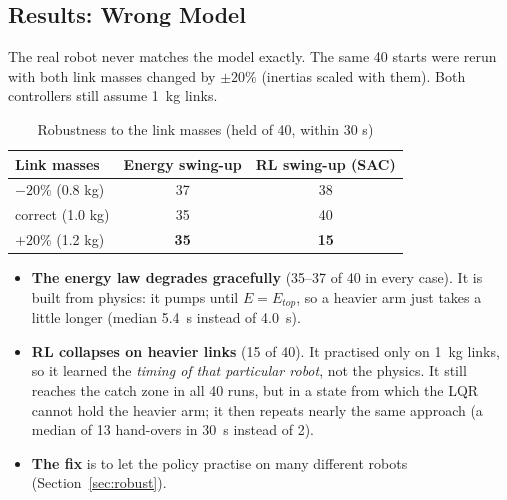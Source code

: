 \documentclass[12pt,a4paper]{article}
\begin{document}
\subsection{Results: Wrong Model}
The real robot never matches the model exactly. The same 40 starts were rerun with both link masses changed by $\pm20\%$ (inertias scaled with them). Both controllers still assume 1~kg links.
\begin{table}[H]
\centering
\caption{Robustness to the link masses (held of 40, within 30 s)}
\label{tab:rlrob}
\begin{tabular}{|l|c|c|}
\hline
Link masses & Energy swing-up & RL swing-up (SAC)\\ \hline
$-20\%$ (0.8 kg) & 37 & 38\\
correct (1.0 kg) & 35 & 40\\
$+20\%$ (1.2 kg) & \textbf{35} & \textbf{15}\\ \hline
\end{tabular}
\end{table}
\begin{itemize}
\item \textbf{The energy law degrades gracefully} (35--37 of 40 in every case). It is built from physics: it pumps until $E=E_{top}$, so a heavier arm just takes a little longer (median 5.4~s instead of 4.0~s).
\item \textbf{RL collapses on heavier links} (15 of 40). It practised only on 1~kg links, so it learned the \emph{timing of that particular robot}, not the physics. It still reaches the catch zone in all 40 runs, but in a state from which the LQR cannot hold the heavier arm; it then repeats nearly the same approach (a median of 13 hand-overs in 30~s instead of 2).
\item \textbf{The fix} is to let the policy practise on many different robots (Section~\ref{sec:robust}).
\end{itemize}
\end{document}
